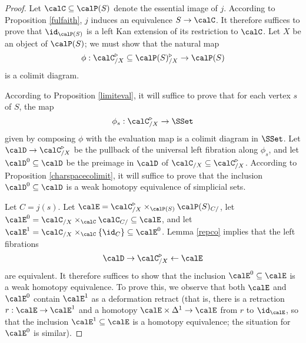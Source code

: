 \begin{proof}
Let $\calC \subseteq \calP(S)$ denote the essential image of $j$. According to Proposition \ref{fulfaith}, $j$ induces an equivalence $S \rightarrow \calC$. It therefore suffices to prove that
$\id_{\calP(S)}$ is a left Kan extension of its restriction to $\calC$. Let $X$ be an object of $\calP(S)$; we must show that the natural map
$$ \phi: \calC_{/X}^{\triangleright} \subseteq \calP(S)_{/X}^{\triangleright} \rightarrow \calP(S)$$
is a colimit diagram.

According to Proposition \ref{limiteval}, it will suffice to prove that for each vertex $s$ of $S$, the map
$$ \phi_{s}: \calC_{/X}^{\triangleright} \rightarrow \SSet$$ given by composing $\phi$ with the evaluation map is a colimit diagram in $\SSet$. Let 
$\calD \rightarrow \calC_{/X}^{\triangleright}$ be the pullback of the universal left fibration along $\phi_{s}$, and let $\calD^0 \subseteq \calD$ be the preimage in $\calD$ of
$\calC_{/X} \subseteq \calC_{/X}^{\triangleright}$. According to Proposition \ref{charspacecolimit}, it will suffice to prove that the inclusion $\calD^{0} \subseteq \calD$ is a weak homotopy equivalence of simplicial sets.

Let $C = j(s)$. Let $\calE = \calC_{/X}^{\triangleright} \times_{\calP(S)} \calP(S)_{C/}$,
let $\calE^{0} = \calC_{/X} \times_{\calC} \calC_{C/} \subseteq \calE$, and let
$\calE^{1} = \calC_{/X} \times_{\calC} \{ \id_{C} \} \subseteq \calE^{0}$.
Lemma \ref{repco} implies that the left fibrations
$$ \calD \rightarrow \calC_{/X}^{\triangleright} \leftarrow \calE$$ are
equivalent. It therefore suffices to show that the inclusion $\calE^{0} \subseteq \calE$ is a weak homotopy equivalence. To prove this, we observe that both $\calE$ and $\calE^{0}$ contain
$\calE^{1}$ as a deformation retract (that is, there is a retraction $r: \calE \rightarrow \calE^{1}$ and a homotopy $\calE \times \Delta^1 \rightarrow \calE$ from $r$ to $\id_{\calE}$, so that
the inclusion $\calE^{1} \subseteq \calE$ is a homotopy equivalence; the situation for
$\calE^0$ is similar).
\end{proof}

